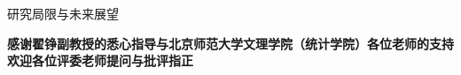 \documentclass[aspectratio=169,9pt,xcolor=dvipsnames]{beamer}
\newcommand{\highlight}[1]{\textcolor{myred}{\textbf{#1}}}
\begin{document}
\begin{frame}{研究局限与未来展望}
  \vspace{0.2cm}
  \begin{center}
    \large\textbf{感谢翟铮副教授的悉心指导与北京师范大学文理学院（统计学院）各位老师的支持}\\[0.3cm]
    \LARGE\highlight{欢迎各位评委老师提问与批评指正}
  \end{center}
\end{frame}
\end{document}
